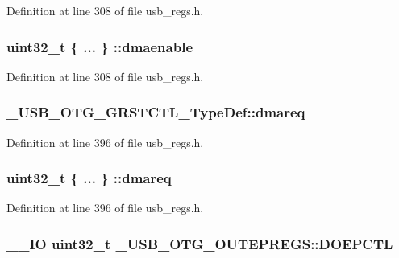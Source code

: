 Definition at line 308 of file usb\-\_\-regs.\-h.

\hypertarget{group___u_s_b___o_t_g___d_r_i_v_e_r_gac691d0e888e9edac5d88d871e580f823}{
\subsubsection[{dmaenable}]{\setlength{\rightskip}{0pt plus 5cm}uint32\-\_\-t \{ ... \} \-::dmaenable}}\label{group___u_s_b___o_t_g___d_r_i_v_e_r_gac691d0e888e9edac5d88d871e580f823}


Definition at line 308 of file usb\-\_\-regs.\-h.

\hypertarget{group___u_s_b___o_t_g___d_r_i_v_e_r_gad333c8546ac5b74a5a3ef8eb9377268d}{
\subsubsection[{dmareq}]{ \-\_\-\-U\-S\-B\-\_\-\-O\-T\-G\-\_\-\-G\-R\-S\-T\-C\-T\-L\-\_\-\-Type\-Def\-::dmareq}}\label{group___u_s_b___o_t_g___d_r_i_v_e_r_gad333c8546ac5b74a5a3ef8eb9377268d}


Definition at line 396 of file usb\-\_\-regs.\-h.

\hypertarget{group___u_s_b___o_t_g___d_r_i_v_e_r_ga95d165ffbe065242cf7b6ca68a9456f9}{
\subsubsection[{dmareq}]{\setlength{\rightskip}{0pt plus 5cm}uint32\-\_\-t \{ ... \} \-::dmareq}}\label{group___u_s_b___o_t_g___d_r_i_v_e_r_ga95d165ffbe065242cf7b6ca68a9456f9}


Definition at line 396 of file usb\-\_\-regs.\-h.

\hypertarget{group___u_s_b___o_t_g___d_r_i_v_e_r_ga4d04fed35191712f93a6ccff18624968}{
\subsubsection[{D\-O\-E\-P\-C\-T\-L}]{\setlength{\rightskip}{0pt plus 5cm}\-\_\-\-\_\-\-I\-O {\bf uint32\-\_\-t} \-\_\-\-U\-S\-B\-\_\-\-O\-T\-G\-\_\-\-O\-U\-T\-E\-P\-R\-E\-G\-S\-::\-D\-O\-E\-P\-C\-T\-L}}\label{group___u_s_b___o_t_g___d_r_i_v_e_r_ga4d04fed35191712f93a6ccff18624968}


